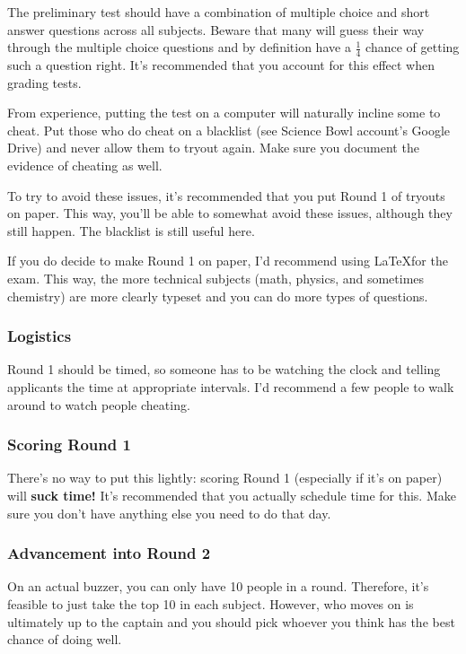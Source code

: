 \documentclass[11pt, letterpaper]{article}
\begin{document}
The preliminary test should have a combination of multiple choice and short answer questions across all subjects.
Beware that many will guess their way through the multiple choice questions and by definition have a $\frac{1}{4}$ chance of getting such a question right.
It's recommended that you account for this effect when grading tests.

From experience, putting the test on a computer will naturally incline some to cheat.
Put those who do cheat on a blacklist (see Science Bowl account's Google Drive) and never allow them to tryout again.
Make sure you document the evidence of cheating as well.

To try to avoid these issues, it's recommended that you put Round 1 of tryouts on paper.
This way, you'll be able to somewhat avoid these issues, although they still happen.
The blacklist is still useful here.

If you do decide to make Round 1 on paper, I'd recommend using \LaTeX for the exam.
This way, the more technical subjects (math, physics, and sometimes chemistry) are more clearly typeset and you can do more types of questions.

\subsubsection{Logistics}

Round 1 should be timed, so someone has to be watching the clock and telling applicants the time at appropriate intervals.
I'd recommend a few people to walk around to watch people cheating.

\subsubsection{Scoring Round 1}

There's no way to put this lightly: scoring Round 1 (especially if it's on paper) will \textbf{suck time!}
It's recommended that you actually schedule time for this.
Make sure you don't have anything else you need to do that day.

\subsubsection{Advancement into Round 2}
On an actual buzzer, you can only have 10 people in a round.
Therefore, it's feasible to just take the top 10 in each subject.
However, who moves on is ultimately up to the captain and you should pick whoever you think has the best chance of doing well.
\end{document}

